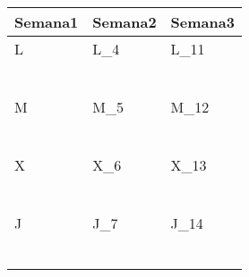 \clearpage
{}


	\renewcommand{\arraystretch}{1.24}\scriptsize
	\begin{longtabu} to \textwidth { X[l] X[l] X[l]}
		\centering \textbf{Semana1} &  \centering\textbf{Semana2}  &   \centering\textbf{Semana3}  \\
		\toprule
		L & L_{4} & L_{11} \\
		  & \makebox{$\square$}\dotfill & \makebox{$\square$}\dotfill \\
		  & \dotfill & \dotfill \\
		  & \makebox{$\square$}\dotfill & \makebox{$\square$}\dotfill \\
		  & \dotfill & \dotfill \\
		  & \makebox{$\square$}\dotfill & \makebox{$\square$}\dotfill \\
		  & \dotfill & \dotfill \\

		\hline

		M & M_{5} & M_{12} \\
		  & \makebox{$\square$}\dotfill & \makebox{$\square$}\dotfill \\
		  & \dotfill & \dotfill \\
		  & \makebox{$\square$}\dotfill & \makebox{$\square$}\dotfill \\
		  & \dotfill & \dotfill \\
		  & \makebox{$\square$}\dotfill & \makebox{$\square$}\dotfill \\
		  & \dotfill & \dotfill \\

		\hline

		X & X_{6} & X_{13} \\
		  & \makebox{$\square$}\dotfill & \makebox{$\square$}\dotfill \\
		  & \dotfill & \dotfill \\
		  & \makebox{$\square$}\dotfill & \makebox{$\square$}\dotfill \\
		  & \dotfill & \dotfill \\
		  & \makebox{$\square$}\dotfill & \makebox{$\square$}\dotfill \\
		  & \dotfill & \dotfill \\

		\hline

		J & J_{7} & J_{14} \\
		  & \makebox{$\square$}\dotfill & \makebox{$\square$}\dotfill \\
		  & \dotfill & \dotfill \\
		  & \makebox{$\square$}\dotfill & \makebox{$\square$}\dotfill \\
		  & \dotfill & \dotfill \\
		  & \makebox{$\square$}\dotfill & \makebox{$\square$}\dotfill \\
		  & \dotfill & \dotfill \\


\end{longtabu}
